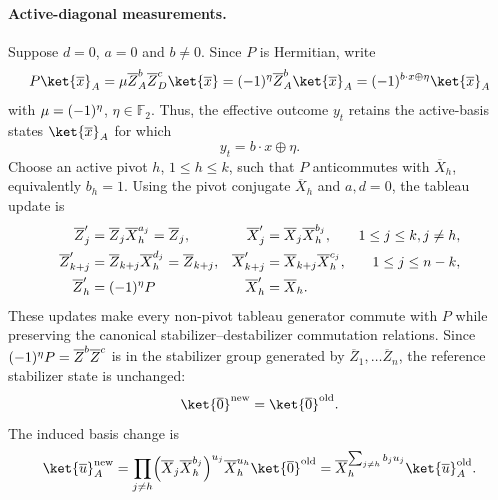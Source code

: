 \documentclass[a4paper,onecolumn,unpublished]{quantumarticle}
\DeclarePairedDelimiter\rbra{\lparen}{\rparen}
\newcommand{\FF}{\mathbb{F}}
\begin{document}
\paragraph{Active-diagonal measurements.}
Suppose $d = 0$, $a = 0$ and $b \neq 0$.
Since $P$ is Hermitian, write
\begin{equation*}
    P\ket{\overline{x}}_A = \mu \overline{Z}^b_A\overline{Z}^c_D\ket{\overline{x}} = \rbra{-1}^{\eta}\overline{Z}^b_A\ket{\overline{x}}_A = \rbra{-1}^{b\cdot x \oplus \eta}\ket{\overline{x}}_A
\end{equation*}
with $\mu = \rbra{-1}^{\eta}$, $\eta \in \FF_2$.
Thus, the effective outcome $y_t$ retains the active-basis states $\ket{\overline{x}}_{A}$ for which
\begin{equation}\label{eq:active-diagonal-constraint}
    y_t = b\cdot x \oplus \eta.
\end{equation}
Choose an active pivot $h$, $1\leq h \leq k$, such that $P$ anticommutes with $\overline{X}_h$, equivalently $b_h = 1$.
Using the pivot conjugate $\overline{X}_{h}$ and $a,d=0$, the tableau update is
\begin{align*}
    \overline{Z}_j'
    &=
    \overline{Z}_j
    \overline{X}_{h}^{a_j} = \overline{Z}_j,
    &
    \overline{X}_j'
    &=
    \overline{X}_j
    \overline{X}_{h}^{b_j},
    &
    1\leq j \leq k,  j \neq h, \\
    \overline{Z}_{k+j}'
    &=
    \overline{Z}_{k+j}
    \overline{X}_{h}^{d_{j}} = \overline{Z}_{k+j},
    &
    \overline{X}_{k+j}'
    &=
    \overline{X}_{k+j}
    \overline{X}_{h}^{c_j},
    &
    1\leq j \leq n-k, \\
    \overline{Z}_h' &= \rbra{-1}^{\eta} P & \overline{X}_h' &= \overline{X}_h.
\end{align*}
These updates make every non-pivot tableau generator commute with $P$ while preserving the canonical stabilizer--destabilizer commutation relations.
Since $\rbra{-1}^{\eta}P = \overline{Z}^b\overline{Z}^c$ is in the stabilizer group generated by $\overline{Z}_1,\ldots \overline{Z}_n$,
the reference stabilizer state is unchanged:
\begin{equation*}
    \ket{\overline{0}}^{\text{new}} = \ket{\overline{0}}^{\text{old}}.
\end{equation*}
The induced basis change is
\begin{equation*}
    \ket{\overline{u}}^{\text{new}}_A = \prod_{j\neq h}
    \rbra*{\overline{X}_j\overline{X}_h^{b_j}}^{u_j} \overline{X}_h^{u_h}
    \ket{\overline{0}}^{\mathrm{old}} = \overline{X}_h^{\sum_{j\neq h}b_ju_j}\ket{\overline{u}}_{A}^{\text{old}}.
\end{equation*}
\end{document}
